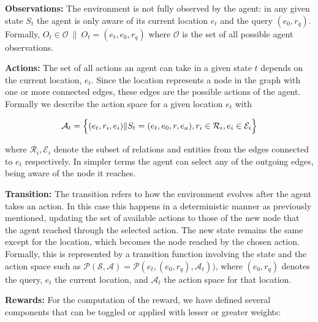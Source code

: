 \textbf{Observations:} The environment is not fully observed by the agent: in any given state $S_t$ the agent is only aware of its current location $e_t$ and the query $(e_0,r_q)$. Formally, $O_t \in \mathcal{O} ~\|~ O_t = (e_t, e_0, r_q)$ where $\mathcal{O}$ is the set of all possible agent observations.

\textbf{Actions:} The set of all actions an agent can take in a given state $t$ depends on the current location, $e_t$. Since the location represents a node in the graph with one or more connected edges, these edges are the possible actions of the agent. Formally we describe the action space for a given location $e_t$ with 

\begin{equation}
\label{eq:ActionSpace}
\mathcal{A}_t  = \Bigl\{ (e_t,r_i,e_i)  \|  S_t = (e_t,e_0,r,e_a) , r_i \in   \mathcal{R}_i ,  e_i \in   \mathcal{E}_i  \Bigl\}
\end{equation}


where $\mathcal{R}_i,\mathcal{E}_i$ denote the subset of relations and entities from the edges connected to $e_{t}$ respectively. In simpler terms the agent can select any of the outgoing edges, being aware of the node it reaches.

\textbf{Transition:} The transition refers to how the environment evolves after the agent takes an action. In this case this happens in a deterministic manner as previously mentioned, updating the set of available actions to those of the new node that the agent reached through the selected action. The new state remains the same except for the location, which becomes the node reached by the chosen action. Formally, this is represented by a transition function involving the state and the action space such as $\mathcal{P}( \mathcal{S,A} ) = \mathcal{P}(e_t ,(e_0,r_q), \mathcal{A} _t))$, where $(e_0,r_q)$ denotes the query, $e_t$ the current location, and  $\mathcal{A}_t$ the action space for that location.

\textbf{Rewards:} For the computation of the reward, we have defined several components that can be toggled or applied with lesser or greater weights:


